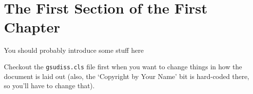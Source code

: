\documentclass[../../main.tex]{subfiles}  %
\begin{document}
\section{The First Section of the First Chapter}
	
    You should probably introduce some stuff here
    
    Checkout the \verb|gsudiss.cls| file first when you want to change things in how the document is laid out (also, the `Copyright by Your Name' bit is hard-coded there, so you'll have to change that).
\end{document}
